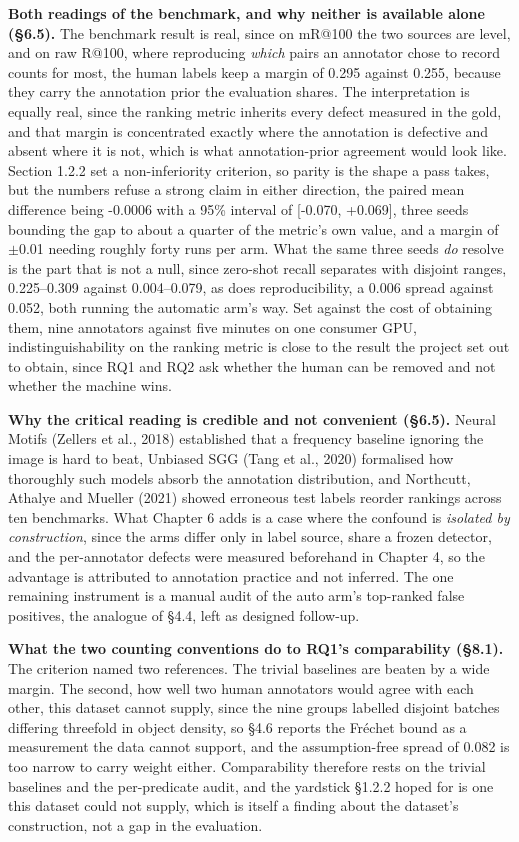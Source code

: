 \textbf{Both readings of the benchmark, and why neither is available alone (\S{}6.5).} The benchmark result is real, since on mR@100 the two sources are level, and on raw R@100, where reproducing \textit{which} pairs an annotator chose to record counts for most, the human labels keep a margin of 0.295 against 0.255, because they carry the annotation prior the evaluation shares. The interpretation is equally real, since the ranking metric inherits every defect measured in the gold, and that margin is concentrated exactly where the annotation is defective and absent where it is not, which is what annotation-prior agreement would look like. Section 1.2.2 set a non-inferiority criterion, so parity is the shape a pass takes, but the numbers refuse a strong claim in either direction, the paired mean difference being -0.0006 with a 95\% interval of [-0.070, +0.069], three seeds bounding the gap to about a quarter of the metric's own value, and a margin of $\pm$0.01 needing roughly forty runs per arm. What the same three seeds \textit{do} resolve is the part that is not a null, since zero-shot recall separates with disjoint ranges, 0.225--0.309 against 0.004--0.079, as does reproducibility, a 0.006 spread against 0.052, both running the automatic arm's way. Set against the cost of obtaining them, nine annotators against five minutes on one consumer GPU, indistinguishability on the ranking metric is close to the result the project set out to obtain, since RQ1 and RQ2 ask whether the human can be removed and not whether the machine wins.

\textbf{Why the critical reading is credible and not convenient (\S{}6.5).} Neural Motifs (Zellers et al., 2018) established that a frequency baseline ignoring the image is hard to beat, Unbiased SGG (Tang et al., 2020) formalised how thoroughly such models absorb the annotation distribution, and Northcutt, Athalye and Mueller (2021) showed erroneous test labels reorder rankings across ten benchmarks. What Chapter 6 adds is a case where the confound is \textit{isolated by construction}, since the arms differ only in label source, share a frozen detector, and the per-annotator defects were measured beforehand in Chapter 4, so the advantage is attributed to annotation practice and not inferred. The one remaining instrument is a manual audit of the auto arm's top-ranked false positives, the analogue of \S{}4.4, left as designed follow-up.

\textbf{What the two counting conventions do to RQ1's comparability (\S{}8.1).} The criterion named two references. The trivial baselines are beaten by a wide margin. The second, how well two human annotators would agree with each other, this dataset cannot supply, since the nine groups labelled disjoint batches differing threefold in object density, so \S{}4.6 reports the Fréchet bound as a measurement the data cannot support, and the assumption-free spread of 0.082 is too narrow to carry weight either. Comparability therefore rests on the trivial baselines and the per-predicate audit, and the yardstick \S{}1.2.2 hoped for is one this dataset could not supply, which is itself a finding about the dataset's construction, not a gap in the evaluation.